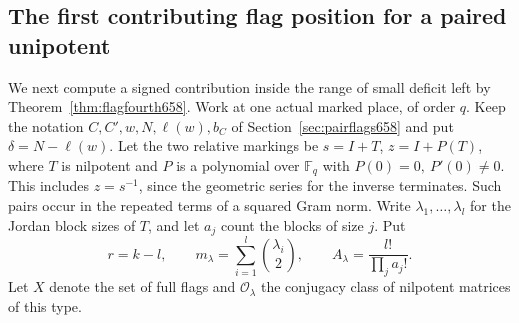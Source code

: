 \documentclass[a4paper,11pt]{article}
\theoremstyle{definition}
\theoremstyle{remark}
\numberwithin{equation}{section}
\begin{document}
\subsection{The first contributing flag position for a paired unipotent}
\label{sec:pairedunipotent659}

We next compute a signed contribution inside the range of small
deficit left by Theorem~\ref{thm:flagfourth658}. Work at one
actual marked place, of order \(q\). Keep the notation
\(C,C',w,N,\ell(w),b_C\) of Section~\ref{sec:pairflags658} and
put \(\delta=N-\ell(w)\). Let the two relative markings be
\(s=I+T\), \(z=I+P(T)\), where \(T\) is nilpotent and \(P\)
is a polynomial over \(\mathbb F_q\) with \(P(0)=0,\ P'(0)\ne0\).
This includes \(z=s^{-1}\), since the geometric series for the
inverse terminates. Such pairs occur in the repeated terms of a
squared Gram norm. Write \(\lambda_1,\ldots,\lambda_l\) for the
Jordan block sizes of \(T\), and let \(a_j\) count the blocks
of size \(j\). Put
\[
   r=k-l,\qquad m_\lambda=\sum_{i=1}^l\binom{\lambda_i}{2},
   \qquad A_\lambda=\frac{l!}{\prod_j a_j!}.
\]
Let \(X\) denote the set of full flags and \(\mathcal O_\lambda\)
the conjugacy class of nilpotent matrices of this type.
\end{document}
